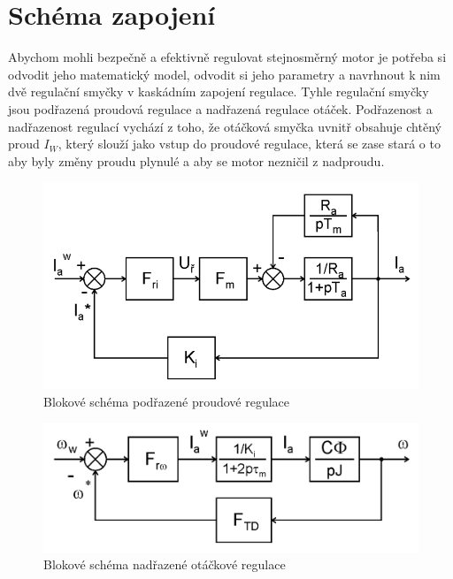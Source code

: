 \documentclass{protokol}
\begin{document}
\maketitle



\section{Schéma zapojení}
Abychom mohli bezpečně a efektivně regulovat stejnosměrný motor je potřeba si odvodit jeho matematický model, odvodit si jeho parametry a navrhnout k nim dvě regulační smyčky v kaskádním zapojení regulace. Tyhle regulační smyčky jsou podřazená proudová regulace a nadřazená regulace otáček. Podřazenost a nadřazenost regulací vychází z toho, že otáčková smyčka uvnitř obsahuje chtěný proud $I_W$, který slouží jako vstup do proudové regulace, která se zase stará o to aby byly změny proudu plynulé a aby se motor nezničil z nadproudu.

\begin{figure}[H]
    \centering
    \includegraphics[width=1\linewidth]{ProudovaRegulace.png}
    \caption{Blokové schéma podřazené proudové regulace}
    \label{fig:ProudovaRegulace}
\end{figure}

\begin{figure}[H]
    \centering
    \includegraphics[width=1\linewidth]{OtackovaRegulace.png}
    \caption{Blokové schéma nadřazené otáčkové regulace}
    \label{fig:OtackovaRegulace}
\end{figure}
\end{document}
